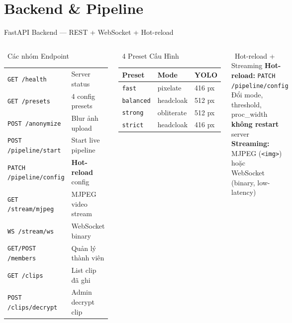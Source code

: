 \documentclass[aspectratio=169, 11pt]{beamer}
\begin{document}
\section{Backend \& Pipeline}

\begin{frame}{FastAPI Backend --- REST + WebSocket + Hot-reload}
\begin{columns}[T]
\begin{block}{\faServer\ Các nhóm Endpoint}
\footnotesize\renewcommand{\arraystretch}{1.2}
\begin{tabular}{ll}
\texttt{GET /health}            & Server status \\
\texttt{GET /presets}           & 4 config presets \\
\hline
\texttt{POST /anonymize}        & Blur ảnh upload \\
\texttt{POST /pipeline/start}   & Start live pipeline \\
\texttt{PATCH /pipeline/config} & \textbf{Hot-reload} config \\
\hline
\texttt{GET /stream/mjpeg}      & MJPEG video stream \\
\texttt{WS /stream/ws}          & WebSocket binary \\
\hline
\texttt{GET/POST /members}      & Quản lý thành viên \\
\texttt{GET /clips}             & List clip đã ghi \\
\texttt{POST /clips/decrypt}    & Admin decrypt clip \\
\end{tabular}
\end{block}
\begin{block}{\faDatabase\ 4 Preset Cấu Hình}
\footnotesize\renewcommand{\arraystretch}{1.3}
\begin{tabular}{lll}
\textbf{Preset} & \textbf{Mode} & \textbf{YOLO} \\
\hline
\texttt{fast}     & pixelate   & 416 px \\
\texttt{balanced} & headcloak  & 512 px \\
\texttt{strong}   & obliterate & 512 px \\
\texttt{strict}   & headcloak  & 416 px \\
\end{tabular}
\end{block}
\begin{block}{\faBolt\ Hot-reload + Streaming}
\footnotesize
\textbf{Hot-reload:} \texttt{PATCH /pipeline/config}\\
Đổi mode, threshold, proc\_width \textbf{không restart} server\\[3pt]
\textbf{Streaming:} MJPEG (\texttt{<img>}) hoặc\\
WebSocket (binary, low-latency)
\end{block}
\end{columns}
\end{frame}
\end{document}
